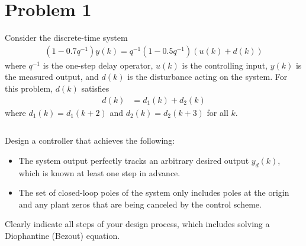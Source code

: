 \section*{Problem 1}

Consider the discrete-time system
\begin{align*}
    (1 - 0.7 q^{-1}) y(k) = q^{-1} (1 - 0.5q^{-1}) (u(k) + d(k))
\end{align*}
where $q^{-1}$ is the one-step delay operator, $u(k)$ is the controlling input, $y(k)$ is the measured
output, and $d(k)$ is the disturbance acting on the system. For this problem, $d(k)$ satisfies
\begin{align*}
    d(k) & = d_1(k) + d_2(k)
\end{align*}
where $d_1(k) = d_1(k+2)$ and $d_2(k) = d_2(k+3)$ for all $k$.

$\,$

\noindent Design a controller that achieves the following:
\begin{itemize}
    \item
    The system output perfectly tracks an arbitrary desired output $y_d(k)$, which is known at least one step in advance.

    \item
    The set of closed-loop poles of the system only includes poles at the origin and any plant zeros that are being canceled by the control scheme.
    
\end{itemize}
Clearly indicate all steps of your design process, which includes solving a Diophantine (Bezout) equation.
